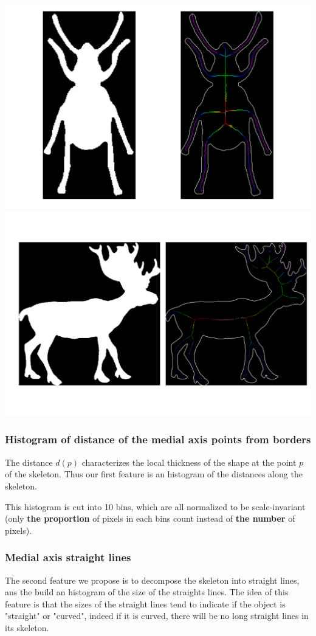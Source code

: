 \documentclass[12pt]{article}
\begin{document}
\includegraphics[scale=0.25]{beetle_281.png}
\includegraphics[scale=0.25]{deer_79.png}

\subsubsection{Histogram of distance of the medial axis points from borders}

The distance $d(p)$ characterizes the local thickness of the shape at the point $p$ of the skeleton. Thus our first feature is an histogram of the distances along the skeleton.

This histogram is cut into 10 bins, which are all normalized to be scale-invariant (only \textbf{the proportion} of pixels in each bins count instead of \textbf{the number} of pixels).

\subsubsection{Medial axis straight lines}
The second feature we propose is to decompose the skeleton into straight lines, ans the build an histogram of the size of the straights lines.
The idea of this feature is that the sizes of the straight lines tend to indicate if the object is "straight" or "curved", indeed if it is curved, there will be no long straight lines in its skeleton.
\end{document}
